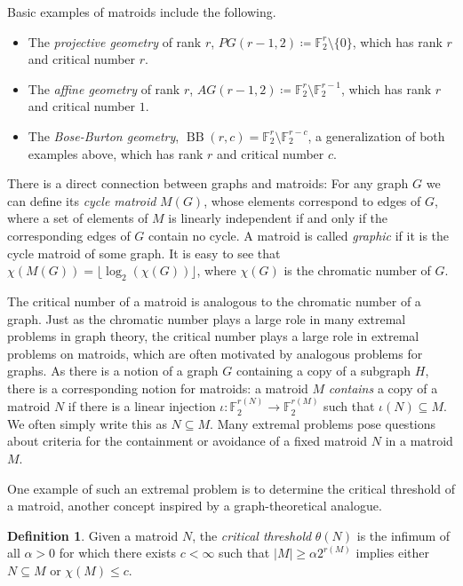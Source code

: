 \documentclass{article}
\theoremstyle{plain}
\theoremstyle{definition}
\theoremstyle{definition}
\newtheorem{defn}[theorem]{Definition}
\theoremstyle{remark}
\numberwithin{equation}{section}
\newcommand{\FF}{\mathbb{F}}
\DeclareMathOperator{\BB}{BB}
\begin{document}
Basic examples of matroids include the following.

\begin{itemize}
    \item The \emph{projective geometry} of rank $r$, $PG(r-1,2)\coloneqq \FF_2^r\setminus \{0\}$, which has rank $r$ and critical number $r$.
    \item The \emph{affine geometry} of rank $r$, $AG(r-1,2)\coloneqq \FF_2^r\setminus \FF_2^{r-1}$, which has rank $r$ and critical number $1$.
    \item The \emph{Bose-Burton geometry}, $\BB(r,c)=\FF_2^r\setminus \FF_2^{r-c}$, a generalization of both examples above, which has rank $r$ and critical number $c$.
\end{itemize}

There is a direct connection between graphs and matroids: For any graph $G$ we can define its \emph{cycle matroid} $M(G)$, whose elements correspond to edges of $G$, where a set of elements of $M$ is linearly independent if and only if the corresponding edges of $G$ contain no cycle. A matroid is called \emph{graphic} if it is the cycle matroid of some graph. It is easy to see that $\chi(M(G))=\lfloor \log_2(\chi(G))\rfloor$, where $\chi(G)$ is the chromatic number of $G$.

The critical number of a matroid is analogous to the chromatic number of a graph. Just as the chromatic number plays a large role in many extremal problems in graph theory, the critical number plays a large role in extremal problems on matroids, which are often motivated by analogous problems for graphs. As there is a notion of a graph $G$ containing a copy of a subgraph $H$, there is a corresponding notion for matroids: a matroid $M$ \emph{contains} a copy of a matroid $N$ if there is a linear injection $\iota:\FF_2^{r(N)}\to \FF_2^{r(M)}$ such that $\iota(N)\subseteq M$. We often simply write this as $N\subseteq M$. Many extremal problems pose questions about criteria for the containment or avoidance of a fixed matroid $N$ in a matroid $M$.

One example of such an extremal problem is to determine the critical threshold of a matroid, another concept inspired by a graph-theoretical analogue.

\begin{defn}
Given a matroid $N$, the \emph{critical threshold} $\theta(N)$ is the infimum of all $\alpha>0$ for which there exists $c<\infty$ such that $|M|\geq \alpha 2^{r(M)}$ implies either $N\subseteq M$ or $\chi(M)\leq c$.
\end{defn}
\end{document}
